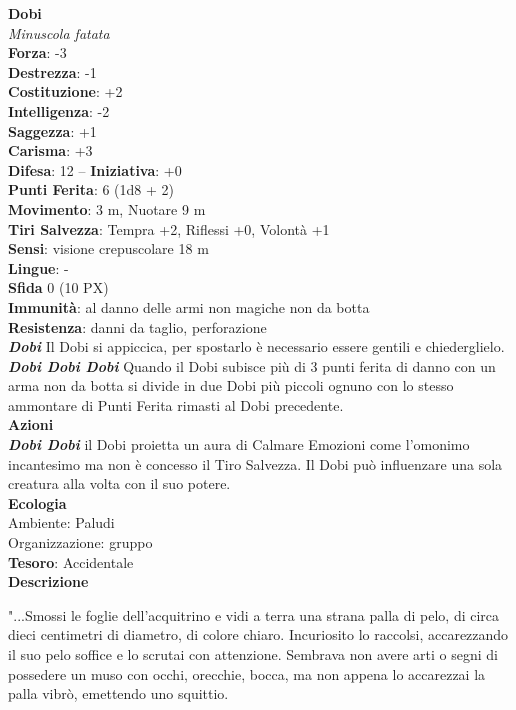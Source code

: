 \begin{multicols}{2}
	\medskip\textbf{Dobi}\\
	\textit{Minuscola fatata}\\
	\textbf{Forza}: -3\\
	\textbf{Destrezza}: -1\\
	\textbf{Costituzione}: +2\\
	\textbf{Intelligenza}: -2\\
	\textbf{Saggezza}: +1\\
	\textbf{Carisma}: +3\\
	\textbf{Difesa}: 12 -- \textbf{Iniziativa}: +0\\
	\textbf{Punti Ferita}: 6 (1d8 + 2)\\
	\textbf{Movimento}: 3 m, Nuotare 9 m\\
	\textbf{Tiri Salvezza}: Tempra +2, Riflessi +0, Volontà +1 \\
	\textbf{Sensi}: visione crepuscolare 18 m \\
	\textbf{Lingue}: - \\
	\textbf{Sfida} 0 (10 PX)\\
	\textbf{Immunità}: al danno delle armi non magiche non da botta\\
	\textbf{Resistenza}: danni da taglio, perforazione\\
	\textit{\textbf{Dobi}} Il Dobi si appiccica, per spostarlo è necessario essere gentili e chiederglielo.\\
	\textit{\textbf{Dobi Dobi Dobi}} Quando il Dobi subisce più di 3 punti ferita di danno con un arma non da botta si divide in due Dobi più piccoli ognuno con lo stesso ammontare di Punti Ferita rimasti al Dobi precedente.\\
	\smallskip\textbf{Azioni}\\
	\textit{\textbf{Dobi Dobi}} il Dobi proietta un aura di Calmare Emozioni come l'omonimo incantesimo ma non è concesso il Tiro Salvezza. Il Dobi può influenzare una sola creatura alla volta con il suo potere.\\
	\textbf{Ecologia}\\
	Ambiente: Paludi\\
	Organizzazione: gruppo\\
	\textbf{Tesoro}: Accidentale\\
	\textbf{Descrizione}\\
	{\small "...Smossi le foglie dell'acquitrino e vidi a terra una strana palla di pelo, di circa dieci centimetri di diametro, di colore chiaro. Incuriosito lo raccolsi, accarezzando il suo pelo soffice e lo scrutai con attenzione. Sembrava non avere arti o segni di possedere un muso con occhi, orecchie, bocca, ma non appena lo accarezzai la palla vibrò, emettendo uno squittio.

}
\end{multicols}
